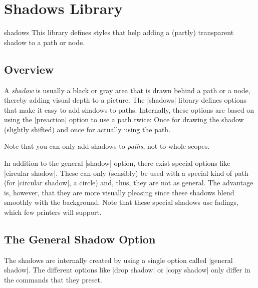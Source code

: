 %
%
%


\section{Shadows Library}
\label{section-libs-shadows}

\begin{tikzlibrary}{shadows}
    This library defines styles that help adding a (partly) transparent shadow
    to a path or node.
\end{tikzlibrary}
%
\begin{codeexample}
    \usetikzlibrary{shadows}
\end{codeexample}


\subsection{Overview}

A \emph{shadow} is usually a black or gray area that is drawn behind a path or
a node, thereby adding visual depth to a picture. The |shadows| library defines
options that make it easy to add shadows to paths. Internally, these options
are based on using the |preaction| option to use a path twice: Once for drawing
the shadow (slightly shifted) and once for actually using the path.

Note that you can only add shadows to \emph{paths}, not to whole scopes.

In addition to the general |shadow| option, there exist special options like
|circular shadow|. These can only (sensibly) be used with a special kind of
path (for |circular shadow|, a circle) and, thus, they are not as general. The
advantage is, however, that they are more visually pleasing since these shadows
blend smoothly with the background. Note that these special shadows use
fadings, which few printers will support.


\subsection{The General Shadow Option}

The shadows are internally created by using a single option called
|general shadow|. The different options like |drop shadow| or |copy shadow|
only differ in the commands that they preset.


